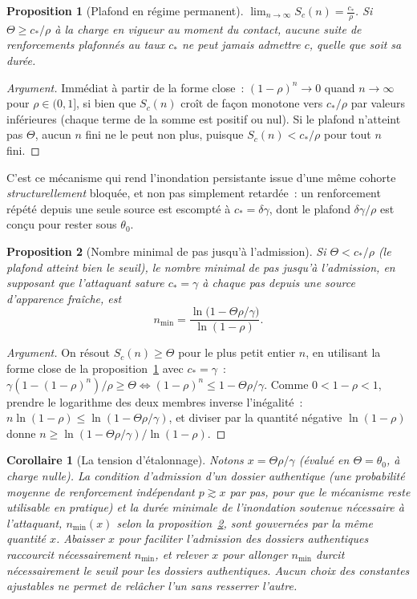 \documentclass[11pt]{article}
\newtheorem{proposition}{Proposition}
\newtheorem{corollaire}{Corollaire}
\begin{document}
\begin{proposition}[Plafond en régime permanent]
\label{prop:plafond}
$\displaystyle \lim_{n\to\infty} S_c(n) = \frac{c_{\ast}}{\rho}$. Si
$\Theta \geq c_{\ast}/\rho$ à la charge en vigueur au moment du contact,
aucune suite de renforcements plafonnés au taux $c_{\ast}$ ne peut jamais
admettre $c$, quelle que soit sa durée.
\end{proposition}
\begin{proof}[Argument]
Immédiat à partir de la forme close~: $(1-\rho)^n \to 0$ quand
$n\to\infty$ pour $\rho \in (0,1]$, si bien que $S_c(n)$ croît de façon
monotone vers $c_{\ast}/\rho$ par valeurs inférieures (chaque terme de la
somme est positif ou nul). Si le plafond n'atteint pas $\Theta$, aucun
$n$ fini ne le peut non plus, puisque $S_c(n) < c_{\ast}/\rho$ pour tout
$n$ fini.
\end{proof}

C'est ce mécanisme qui rend l'inondation persistante issue d'une même
cohorte \emph{structurellement} bloquée, et non pas simplement retardée~:
un renforcement répété depuis une seule source est escompté à
$c_{\ast} = \delta\gamma$, dont le plafond $\delta\gamma/\rho$ est conçu
pour rester sous $\theta_0$.

\begin{proposition}[Nombre minimal de pas jusqu'à l'admission]
\label{prop:minpas}
Si $\Theta < c_{\ast}/\rho$ (le plafond atteint bien le seuil), le
nombre minimal de pas jusqu'à l'admission, en supposant que l'attaquant
sature $c_{\ast}=\gamma$ à chaque pas depuis une source d'apparence
fraîche, est
\[
n_{\min} = \frac{\ln\!\big(1 - \Theta\rho/\gamma\big)}{\ln(1-\rho)}.
\]
\end{proposition}
\begin{proof}[Argument]
On résout $S_c(n) \geq \Theta$ pour le plus petit entier $n$, en
utilisant la forme close de la proposition~\ref{prop:plafond} avec
$c_{\ast}=\gamma$~: $\gamma(1-(1-\rho)^n)/\rho \geq \Theta \iff
(1-\rho)^n \leq 1-\Theta\rho/\gamma$. Comme $0<1-\rho<1$, prendre le
logarithme des deux membres inverse l'inégalité~:
$n\ln(1-\rho) \leq \ln(1-\Theta\rho/\gamma)$, et diviser par la quantité
négative $\ln(1-\rho)$ donne
$n \geq \ln(1-\Theta\rho/\gamma)/\ln(1-\rho)$.
\end{proof}

\begin{corollaire}[La tension d'étalonnage]
\label{cor:tension}
Notons $x = \Theta\rho/\gamma$ (évalué en $\Theta=\theta_0$, à charge
nulle). La condition d'admission d'un dossier authentique (une
probabilité moyenne de renforcement indépendant $p \gtrsim x$ par pas,
pour que le mécanisme reste utilisable en pratique) et la durée minimale
de l'inondation soutenue nécessaire à l'attaquant, $n_{\min}(x)$ selon la
proposition~\ref{prop:minpas}, sont gouvernées par la même quantité $x$.
Abaisser $x$ pour faciliter l'admission des dossiers authentiques
raccourcit nécessairement $n_{\min}$, et relever $x$ pour allonger
$n_{\min}$ durcit nécessairement le seuil pour les dossiers authentiques.
Aucun choix des constantes ajustables ne permet de relâcher l'un sans
resserrer l'autre.
\end{corollaire}
\end{document}
